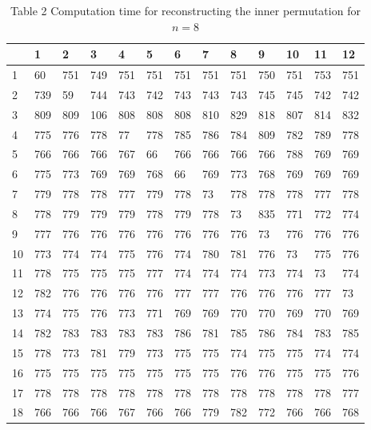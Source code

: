 \documentclass[10pt]{article}
\begin{document}
\begin{table}[h]
\begin{center}
\captionsetup{labelformat=empty}
\caption{Table 2 Computation time for reconstructing the inner permutation for $n=8$}
\begin{tabular}{|l|l|l|l|l|l|l|l|l|l|l|l|l|}
\hline
 & 1 & 2 & 3 & 4 & 5 & 6 & 7 & 8 & 9 & 10 & 11 & 12 \\
\hline
1 & 60 & 751 & 749 & 751 & 751 & 751 & 751 & 751 & 750 & 751 & 753 & 751 \\
\hline
2 & 739 & 59 & 744 & 743 & 742 & 743 & 743 & 743 & 745 & 745 & 742 & 742 \\
\hline
3 & 809 & 809 & 106 & 808 & 808 & 808 & 810 & 829 & 818 & 807 & 814 & 832 \\
\hline
4 & 775 & 776 & 778 & 77 & 778 & 785 & 786 & 784 & 809 & 782 & 789 & 778 \\
\hline
5 & 766 & 766 & 766 & 767 & 66 & 766 & 766 & 766 & 766 & 788 & 769 & 769 \\
\hline
6 & 775 & 773 & 769 & 769 & 768 & 66 & 769 & 773 & 768 & 769 & 769 & 769 \\
\hline
7 & 779 & 778 & 778 & 777 & 779 & 778 & 73 & 778 & 778 & 778 & 777 & 778 \\
\hline
8 & 778 & 779 & 779 & 779 & 778 & 779 & 778 & 73 & 835 & 771 & 772 & 774 \\
\hline
9 & 777 & 776 & 776 & 776 & 776 & 776 & 776 & 776 & 73 & 776 & 776 & 776 \\
\hline
10 & 773 & 774 & 774 & 775 & 776 & 774 & 780 & 781 & 776 & 73 & 775 & 776 \\
\hline
11 & 778 & 775 & 775 & 775 & 777 & 774 & 774 & 774 & 773 & 774 & 73 & 774 \\
\hline
12 & 782 & 776 & 776 & 776 & 776 & 777 & 777 & 776 & 776 & 776 & 777 & 73 \\
\hline
13 & 774 & 775 & 776 & 773 & 771 & 769 & 769 & 770 & 770 & 769 & 770 & 769 \\
\hline
14 & 782 & 783 & 783 & 783 & 783 & 786 & 781 & 785 & 786 & 784 & 783 & 785 \\
\hline
15 & 778 & 773 & 781 & 779 & 773 & 775 & 775 & 774 & 775 & 775 & 774 & 774 \\
\hline
16 & 775 & 775 & 775 & 775 & 775 & 775 & 775 & 776 & 776 & 775 & 775 & 776 \\
\hline
17 & 778 & 778 & 778 & 778 & 778 & 778 & 778 & 778 & 778 & 778 & 778 & 777 \\
\hline
18 & 766 & 766 & 766 & 767 & 766 & 766 & 779 & 782 & 772 & 766 & 766 & 768 \\

\end{tabular}
\end{center}
\end{table}
\end{document}
